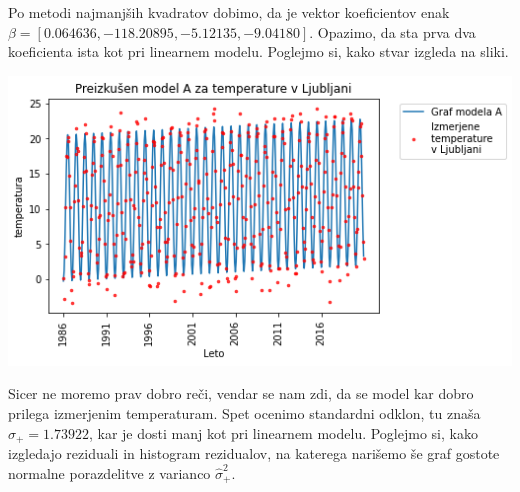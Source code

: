 \documentclass[12pt, a4paper]{article}
\begin{document}
Po metodi najmanjših kvadratov dobimo, da je vektor koeficientov enak 
$\beta = [0.064636, -118.20895, -5.12135, -9.04180]$. Opazimo, da sta prva 
dva koeficienta ista kot pri linearnem modelu. Poglejmo si, kako stvar izgleda 
na sliki.

\begin{center}
    \includegraphics[scale=0.7]{Naloga_3_05}
\end{center}

Sicer ne moremo prav dobro reči, vendar se nam zdi, da se model kar dobro prilega 
izmerjenim temperaturam. Spet ocenimo standardni odklon, tu znaša $\hat{\sigma}_+ 
= 1.73922$, kar je dosti manj kot pri linearnem modelu. Poglejmo si, kako izgledajo 
reziduali in histogram rezidualov, na katerega narišemo še graf gostote normalne 
porazdelitve z varianco $\hat{\sigma}_+^2$.
\end{document}

